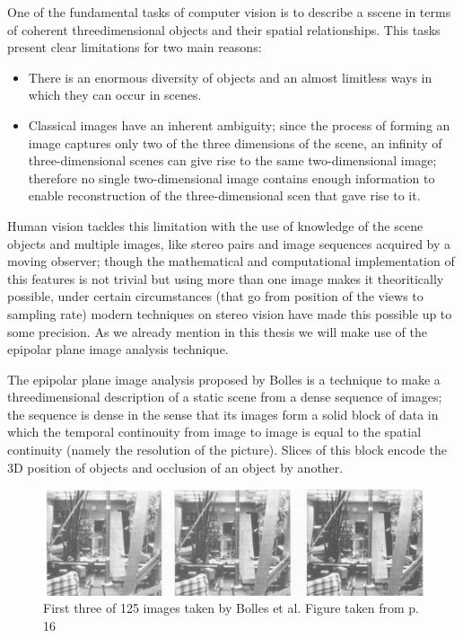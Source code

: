 One of the fundamental tasks of computer vision is to describe a sscene in terms of coherent threedimensional objects and their spatial relationships. This tasks present clear limitations for two main reasons: 
\begin{itemize}
\item There is an enormous diversity of objects and an almost limitless ways in which they can occur in scenes.
\item Classical images have an inherent ambiguity; since the process of forming an image captures only two of the three dimensions of the scene, an infinity of three-dimensional scenes can give rise to the same two-dimensional image; therefore no single two-dimensional image contains enough information to enable reconstruction of the three-dimensional scen that gave rise to it.
\end{itemize}

Human vision tackles this limitation with the use of knowledge of the scene objects and multiple images, like stereo pairs and image sequences acquired by a moving observer; though the mathematical and computational implementation  of this features is not trivial but using more than one image makes it theoritically possible, under certain circumstances (that go from position of the views to sampling rate) modern techniques on stereo vision have made this possible up to some precision. As we already mention in this thesis we will make use of the epipolar plane image analysis technique.

\bigskip

The epipolar plane image analysis proposed by Bolles \cite{Bolles} is a technique to make a threedimensional description of a static scene from a dense sequence of images; the sequence is dense in the sense that its images form a solid block of data in which the temporal continouity from image to image is equal to the spatial continuity (namely the resolution of the picture). Slices of this block encode the 3D position of objects and occlusion of an object by another.

\begin{figure}[h!]
\centering
\includegraphics[width= 1\textwidth]{./Diagrams/multi-views1.jpg}
\caption{First three of 125 images taken by Bolles et al. Figure taken from \cite{Bolles} p. 16}
\label{fig:Bollesmultiviews}
\end{figure}

